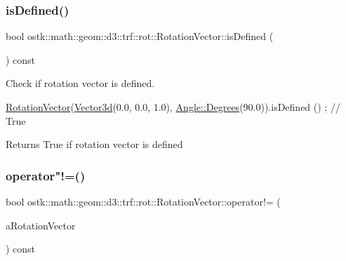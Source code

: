 \subsubsection{\texorpdfstring{is\+Defined()}{isDefined()}}
{\footnotesize\ttfamily bool ostk\+::math\+::geom\+::d3\+::trf\+::rot\+::\+Rotation\+Vector\+::is\+Defined (\begin{DoxyParamCaption}{ }\end{DoxyParamCaption}) const}



Check if rotation vector is defined. 


\begin{DoxyCode}
\hyperlink{classostk_1_1math_1_1geom_1_1d3_1_1trf_1_1rot_1_1_rotation_vector_ad05e6af649dbdd145793773e2ab1cdce}{RotationVector}(\hyperlink{namespaceostk_1_1math_1_1obj_a18744cbf433bce59f6758d9fe3b1dff1}{Vector3d}(0.0, 0.0, 1.0), \hyperlink{classostk_1_1math_1_1geom_1_1_angle_a2cefda601167af07f61f0477776203ca}{Angle::Degrees}(90.0)).isDefined
      () ; \textcolor{comment}{// True}
\end{DoxyCode}


\begin{DoxyReturn}{Returns}
True if rotation vector is defined 
\end{DoxyReturn}
\mbox{\label{classostk_1_1math_1_1geom_1_1d3_1_1trf_1_1rot_1_1_rotation_vector_a82aca5afd690f15ee8c82c343da2c7ea}} 
\subsubsection{\texorpdfstring{operator"!=()}{operator!=()}}
{\footnotesize\ttfamily bool ostk\+::math\+::geom\+::d3\+::trf\+::rot\+::\+Rotation\+Vector\+::operator!= (\begin{DoxyParamCaption}\item[{const \hyperlink{classostk_1_1math_1_1geom_1_1d3_1_1trf_1_1rot_1_1_rotation_vector}{Rotation\+Vector} \&}]{a\+Rotation\+Vector }\end{DoxyParamCaption}) const}



